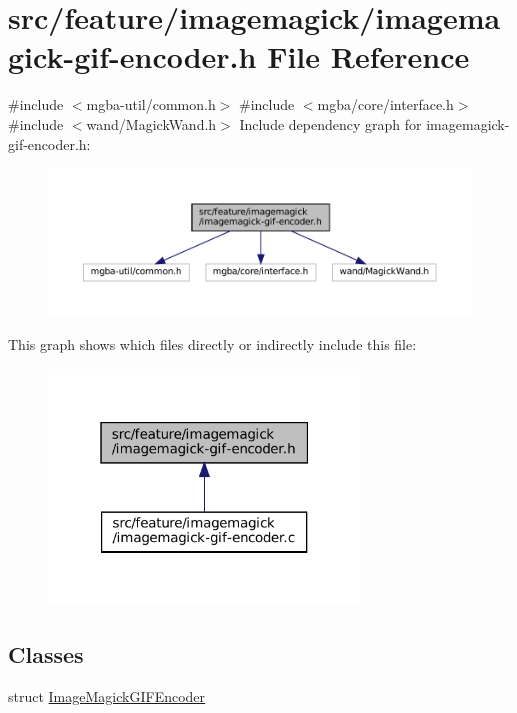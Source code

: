 \hypertarget{imagemagick-gif-encoder_8h}{}\section{src/feature/imagemagick/imagemagick-\/gif-\/encoder.h File Reference}
\label{imagemagick-gif-encoder_8h}
{\ttfamily \#include $<$mgba-\/util/common.\+h$>$}\newline
{\ttfamily \#include $<$mgba/core/interface.\+h$>$}\newline
{\ttfamily \#include $<$wand/\+Magick\+Wand.\+h$>$}\newline
Include dependency graph for imagemagick-\/gif-\/encoder.h\+:
\nopagebreak
\begin{figure}[H]
\begin{center}
\leavevmode
\includegraphics[width=350pt]{imagemagick-gif-encoder_8h__incl}
\end{center}
\end{figure}
This graph shows which files directly or indirectly include this file\+:
\nopagebreak
\begin{figure}[H]
\begin{center}
\leavevmode
\includegraphics[width=235pt]{imagemagick-gif-encoder_8h__dep__incl}
\end{center}
\end{figure}
\subsection*{Classes}
\begin{DoxyCompactItemize}
\item 
struct \mbox{\hyperlink{imagemagick-gif-encoder_8h_struct_image_magick_g_i_f_encoder}{Image\+Magick\+G\+I\+F\+Encoder}}
\end{DoxyCompactItemize}
